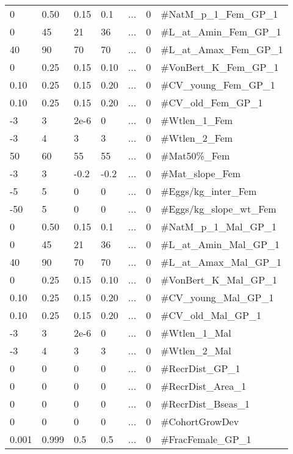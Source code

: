 \begin{center}
\begin{longtable}{p{1cm} p{1cm} p{1cm}  p{1.5cm}  p{1.5cm}  p{1.5cm}  p{5cm}  }
		0    & 0.50 & 0.15 & 0.1  & ... & 0 & \#NatM\_p\_1\_Fem\_GP\_1\\
		0    & 45   & 21   & 36   & ... & 0 & \#L\_at\_Amin\_Fem\_GP\_1 \\
		40   & 90   & 70   & 70   & ... & 0 & \#L\_at\_Amax\_Fem\_GP\_1 \\
		0    & 0.25 & 0.15 & 0.10 & ... & 0 & \#VonBert\_K\_Fem\_GP\_1 \\
		0.10 & 0.25 & 0.15 & 0.20 & ... & 0 & \#CV\_young\_Fem\_GP\_1 \\
		0.10 & 0.25 & 0.15 & 0.20 & ... & 0 & \#CV\_old\_Fem\_GP\_1 \\
		-3   & 3    & 2e-6 & 0    & ... & 0 & \#Wtlen\_1\_Fem \\
		-3   & 4    & 3    & 3    & ... & 0 & \#Wtlen\_2\_Fem \\
		50   & 60   & 55   & 55   & ... & 0 & \#Mat50\%\_Fem  \\
		-3   & 3    & -0.2 & -0.2 & ... & 0 & \#Mat\_slope\_Fem \\
		-5   & 5    & 0    & 0    & ... & 0 & \#Eggs/kg\_inter\_Fem \\
		-50  & 5    & 0    & 0    & ... & 0 & \#Eggs/kg\_slope\_wt\_Fem \\
		0    & 0.50 & 0.15 & 0.1  & ... & 0 & \#NatM\_p\_1\_Mal\_GP\_1\\
		0    & 45   & 21   & 36   & ... & 0 & \#L\_at\_Amin\_Mal\_GP\_1 \\
		40   & 90   & 70   & 70   & ... & 0 & \#L\_at\_Amax\_Mal\_GP\_1 \\
		0    & 0.25 & 0.15 & 0.10 & ... & 0 & \#VonBert\_K\_Mal\_GP\_1 \\
		0.10 & 0.25 & 0.15 & 0.20 & ... & 0 & \#CV\_young\_Mal\_GP\_1 \\
		0.10 & 0.25 & 0.15 & 0.20 & ... & 0 & \#CV\_old\_Mal\_GP\_1 \\
		-3   & 3    & 2e-6 & 0    & ... & 0 & \#Wtlen\_1\_Mal \\
		-3   & 4    & 3    & 3    & ... & 0 & \#Wtlen\_2\_Mal \\
		 0   & 0    & 0    & 0    & ... & 0 & \#RecrDist\_GP\_1 \\
		 0   & 0    & 0    & 0    & ... & 0 & \#RecrDist\_Area\_1 \\
		 0   & 0    & 0    & 0    & ... & 0 & \#RecrDist\_Bseas\_1 \\
		 0   & 0    & 0    & 0    & ... & 0 & \#CohortGrowDev \\
		0.001 & 0.999 & 0.5 & 0.5 & ... & 0 & \#FracFemale\_GP\_1 \\
		\hline
	\end{longtable}
\end{center}

